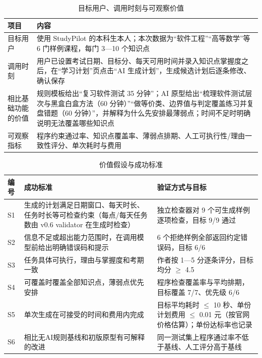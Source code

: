 \documentclass[UTF8,12pt,a4paper]{ctexart}
\begin{document}
\begin{table}[H]
\centering
\caption{目标用户、调用时刻与可观察价值}
\label{tab:value}
\small
\begin{tabularx}{\textwidth}{L{2.6cm}X}
\toprule
项目 & 内容 \\
\midrule
目标用户 & 使用 StudyPilot 的本科生本人；本次数据为“软件工程”“高等数学”等 6 门样例课程，每门 3—10 个知识点 \\
调用时刻 & 用户已设置考试日期、目标分、每天可用时间并录入知识点掌握度之后，在“学习计划”页点击“AI 生成计划”，生成候选计划后逐条修改、确认保存 \\
相比基础功能的价值 & 规则模板给出“复习软件测试 35 分钟”；AI 原型给出“梳理软件测试层次与黑盒白盒方法（60 分钟）”“做等价类、边界值与判定覆盖练习并复盘错题（60 分钟）”，并解释为什么先安排最薄弱点；时间不足时明确说明无法覆盖哪些知识点 \\
可观察指标 & 程序约束通过率、知识点覆盖率、薄弱点排期、人工可执行性/理由一致性评分、单次耗时与费用 \\
\bottomrule
\end{tabularx}
\end{table}

\begin{table}[H]
\centering
\caption{价值假设与成功标准}
\label{tab:criteria}
\small
\begin{tabularx}{\textwidth}{L{0.8cm}L{5.2cm}X}
\toprule
编号 & 成功标准 & 验证方式与目标 \\
\midrule
S1 & 生成的计划满足日期窗口、每天时长、任务时长等可检查约束（每点/每天任务数由 v0.6 validator 在生成时检查） & 独立检查器对 9 个可生成样例逐项检查，目标 9/9 通过 \\
S2 & 信息不足或超出能力范围时，在调用模型前给出明确错误码和提示 & 6 个拒绝样例全部返回约定错误码，目标 6/6 \\
S3 & 任务具体可执行，理由与掌握度和考期一致 & 作者按 1—5 分逐条评分，目标均分 $\ge$ 4.5 \\
S4 & 可覆盖时覆盖全部知识点，薄弱点优先安排 & 程序检查覆盖率与平均排期，目标覆盖 7/7、优先级 6/6 \\
S5 & 单次生成在可接受的时间和费用内完成 & 目标平均耗时 $\le$ 10 秒、单份计划费用 $\le$ 0.01 元（按官网价格估算）；单份达标率也记录 \\
S6 & 相比无AI规则基线和初版原型有可解释的改进 & 同一测试集上程序通过率不低于基线、人工评分高于基线 \\
\bottomrule
\end{tabularx}
\end{table}
\end{document}
